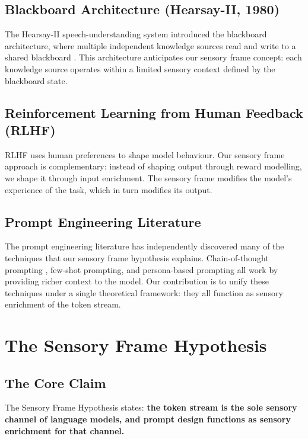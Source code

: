 \documentclass[11pt,a4paper]{article}
\begin{document}
\subsection{Blackboard Architecture (Hearsay-II, 1980)}

The Hearsay-II speech-understanding system introduced the blackboard architecture, where multiple independent knowledge sources read and write to a shared blackboard \cite{hearsay}. This architecture anticipates our sensory frame concept: each knowledge source operates within a limited sensory context defined by the blackboard state.

\subsection{Reinforcement Learning from Human Feedback (RLHF)}

RLHF \cite{rlhf} uses human preferences to shape model behaviour. Our sensory frame approach is complementary: instead of shaping output through reward modelling, we shape it through input enrichment. The sensory frame modifies the model's experience of the task, which in turn modifies its output.

\subsection{Prompt Engineering Literature}

The prompt engineering literature has independently discovered many of the techniques that our sensory frame hypothesis explains. Chain-of-thought prompting \cite{cot}, few-shot prompting, and persona-based prompting all work by providing richer context to the model. Our contribution is to unify these techniques under a single theoretical framework: they all function as sensory enrichment of the token stream.

\section{The Sensory Frame Hypothesis}

\subsection{The Core Claim}

The Sensory Frame Hypothesis states: \textbf{the token stream is the sole sensory channel of language models, and prompt design functions as sensory enrichment for that channel.}
\end{document}
